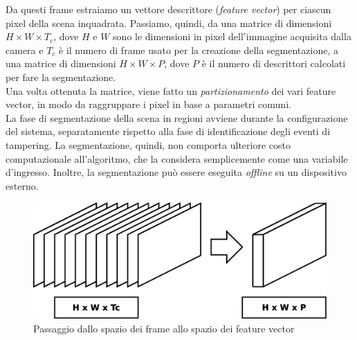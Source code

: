 Da questi frame estraiamo un vettore descrittore (\textit{feature vector}) per ciascun pixel della scena inquadrata.
Passiamo, quindi, da una matrice di dimensioni $H\times W \times T_{c}$, dove $H$ e $W$ sono le dimensioni in pixel dell'immagine acquisita dalla camera e $T_{c}$ \`e il numero di frame usato per la creazione della segmentazione, a una matrice di dimensioni $H\times W \times P$, dove $P$ \`e il numero di descrittori calcolati per fare la segmentazione.\\
Una volta ottenuta la matrice, viene fatto un \textit{partizionamento} dei vari feature vector, in modo da raggruppare i pixel in base a parametri comuni.\\
La fase di segmentazione della scena in regioni avviene durante la configurazione del sistema, separatamente rispetto alla fase di identificazione degli eventi di tampering.
La segmentazione, quindi, non comporta ulteriore costo computazionale all'algoritmo, che la considera semplicemente come una variabile d'ingresso.
Inoltre, la segmentazione pu\`o essere eseguita \textit{offline} su un dispositivo esterno.
\begin{figure}
	\centering
	\includegraphics[width=0.7\linewidth]{diagrammi/FeatureVector}
	\caption{Passaggio dallo spazio dei frame allo spazio dei feature vector}
	\label{fig:FeatureVector}
\end{figure}

